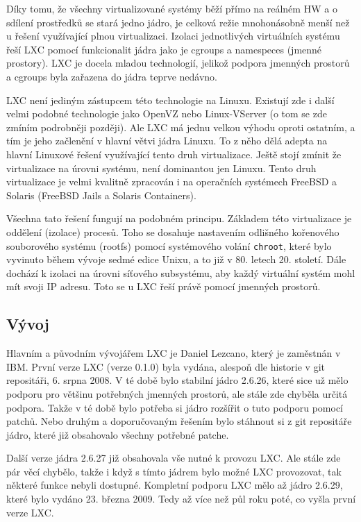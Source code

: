 Díky tomu, že všechny virtualizované systémy běží přímo na reálném HW a o sdílení prostředků se stará jedno jádro, je celková režie mnohonásobně menší než u řešení využívající plnou virtualizaci. Izolaci jednotlivých virtuálních systému řeší LXC pomocí funkcionalit jádra jako je cgroups a namespeces (jmenné prostory). LXC je docela mladou technologií, jelikož podpora jmenných prostorů a cgroups byla zařazena do jádra teprve nedávno.

LXC není jediným zástupcem této technologie na Linuxu. Existují zde i další velmi podobné technologie jako OpenVZ nebo Linux-VServer (o tom se zde zmíním podrobněji později). Ale LXC má jednu velkou výhodu oproti ostatním, a tím je jeho začlenění v hlavní větvi jádra Linuxu. To z něho dělá adepta na hlavní Linuxové řešení využívající tento druh virtualizace. Ještě stojí zmínit že virtualizace na úrovni systému, není dominantou jen Linuxu. Tento druh virtualizace je velmi kvalitně zpracován i na operačních systémech FreeBSD a Solaris (FreeBSD Jails a Solaris Containers).

Všechna tato řešení fungují na podobném principu. Základem této virtualizace je oddělení (izolace) procesů. Toho se dosahuje nastavením odlišného kořenového souborového systému (rootfs) pomocí systémového volání \texttt{chroot}, které bylo vyvinuto během vývoje sedmé edice Unixu, a to již v 80. letech 20. století. Dále dochází k izolaci na úrovni síťového subsystému, aby každý virtuální systém mohl mít svoji IP adresu. Toto se u LXC řeší právě pomocí jmenných prostorů.

\subsection{Vývoj}

Hlavním a původním vývojářem LXC je Daniel Lezcano, který je zaměstnán v IBM. První verze LXC (verze 0.1.0) byla vydána, alespoň dle historie v git repositáři, 6. srpna 2008. V té době bylo stabilní jádro 2.6.26, které sice už mělo podporu pro většinu potřebných jmenných prostorů, ale stále zde chyběla určitá podpora. Takže v té době bylo potřeba si jádro rozšířit o tuto podporu pomocí patchů. Nebo druhým a doporučovaným řešením bylo stáhnout si z git repositáře jádro, které již obsahovalo všechny potřebné patche.

Další verze jádra 2.6.27 již obsahovala vše nutné k provozu LXC. Ale stále zde pár věcí chybělo, takže i když s tímto jádrem bylo možné LXC provozovat, tak některé funkce nebyli dostupné. Kompletní podporu LXC mělo až jádro 2.6.29, které bylo vydáno 23. března 2009. Tedy až více než půl roku poté, co vyšla první verze LXC.

